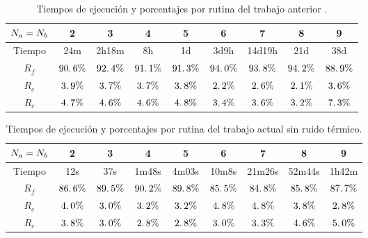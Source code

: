 \begin{table}[h]
 \centering
\begin{tabular}{|c|c|c|c|c|c|c|c|c|}
\hline $N_a=N_b$ & 2 & 3 & 4& 5& 6&7 & 8&9 \\
\hline Tiempo & 24m & 2h18m & 8h & 1d & 3d9h&14d19h & 21d & 38d \\
\hline $R_f$ &$90\ldotp 6\%$ & $92\ldotp 4\%$ &$91\ldotp 1\%$ &$91\ldotp 3\%$ &$94\ldotp 0\%$ &$93\ldotp 8\%$ &$94\ldotp 2\%$ & $88\ldotp 9\%$ \\
\hline $R_e$ &$3\ldotp 9\%$ &$3\ldotp 7\%$ &$3\ldotp 7\%$ &$3\ldotp 8\%$ &$2\ldotp 2\%$ &$2\ldotp 6\%$ &$2\ldotp 1\%$ & $3\ldotp 6\%$\\
\hline $R_c$ &$4\ldotp 7\%$ & $4\ldotp 6\%$&$4\ldotp 6\%$ &$4\ldotp 8\%$ &$3\ldotp 4\%$ &$3\ldotp 6\%$ &$3\ldotp 2\%$ &$7\ldotp 3\%$ \\
\hline
\end{tabular}\caption{Tiempos de ejecuci\'on y porcentajes por rutina del trabajo anterior \cite{gino}.}\label{tabla:tiempos_gino}
\end{table}
\begin{table}[h]
 \centering
\begin{tabular}{|c|c|c|c|c|c|c|c|c|}
\hline $N_a=N_b$ & 2 & 3 & 4& 5& 6&7 & 8&9 \\
\hline Tiempo & 12s & 37s & 1m48s & 4m03s & 10m8s& 21m26s & 52m44s & 1h42m \\
\hline $R_f$ &$86\ldotp 6\%$ & $89\ldotp 5\%$ &$90\ldotp 2\%$ &$89\ldotp 8\%$ &$85\ldotp 5\%$ &$84\ldotp 8\%$ &$85\ldotp 8\%$ & $87\ldotp 7\%$ \\
\hline $R_e$ &$4\ldotp 0\%$ &$3\ldotp 0\%$ &$3\ldotp 2\%$ &$3\ldotp 2\%$ &$4\ldotp 8\%$ &$4\ldotp 8\%$ &$3\ldotp 8\%$ & $2\ldotp 8\%$\\
\hline $R_c$ &$3\ldotp 8\%$ & $3\ldotp 0\%$&$2\ldotp 8\%$ &$2\ldotp 8\%$ &$3\ldotp 0\%$ &$3\ldotp 3\%$ &$4\ldotp 6\%$ &$5\ldotp 0\%$ \\
\hline
\end{tabular}\caption{Tiempos de ejecuci\'on y porcentajes por rutina del trabajo actual sin ruido t\'ermico.}\label{tabla:tiempos_actual_sinruido}
\end{table}


